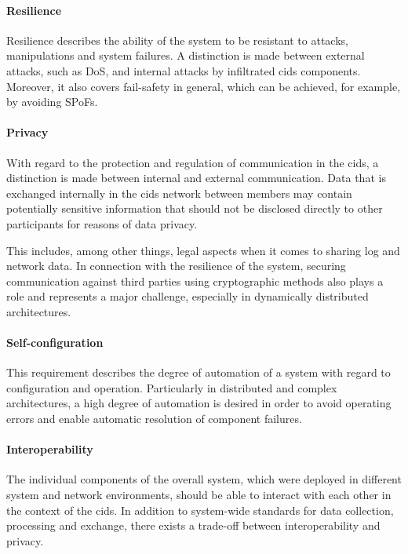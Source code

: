 \paragraph{Resilience} Resilience describes the ability of the system to be resistant to attacks, manipulations and system failures. A distinction is made between external attacks, such as DoS, and internal attacks by infiltrated \acrshort{cids} components. Moreover, it also covers fail-safety in general, which can be achieved, for example, by avoiding SPoFs.

\paragraph{Privacy} With regard to the protection and regulation of communication in the \acrshort{cids}, a distinction is made between internal and external communication. Data that is exchanged internally in the \acrshort{cids} network between members may contain potentially sensitive information that should not be disclosed directly to other participants for reasons of data privacy. 

This includes, among other things, legal aspects when it comes to sharing log and network data. In connection with the resilience of the system, securing communication against third parties using cryptographic methods also plays a role and represents a major challenge, especially in dynamically distributed architectures.

\paragraph{Self-configuration} This requirement describes the degree of automation of a system with regard to configuration and operation. Particularly in distributed and complex architectures, a high degree of automation is desired in order to avoid operating errors and enable automatic resolution of component failures. 

\paragraph{Interoperability} The individual components of the overall system, which were deployed in different system and network environments, should be able to interact with each other in the context of the \acrshort{cids}. In addition to system-wide standards for data collection, processing and exchange, there exists a trade-off between interoperability and privacy.

